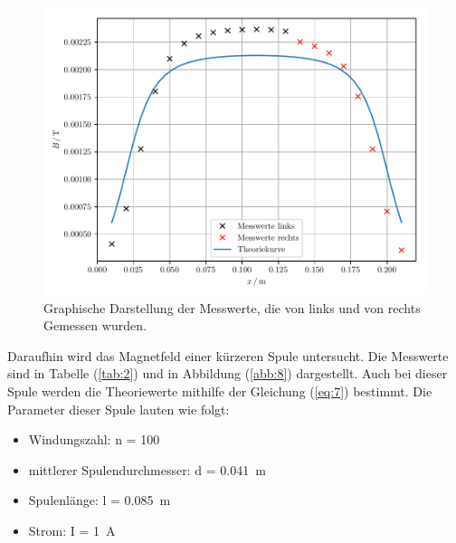 \begin{figure}[H]
  \centering
  \includegraphics{plot1.pdf}
  \caption{Graphische Darstellung der Messwerte, die von links und von rechts Gemessen wurden.}
  \label{abb:7}
\end{figure}


Daraufhin wird das Magnetfeld einer kürzeren Spule untersucht. Die Messwerte sind in
Tabelle (\ref{tab:2}) und in Abbildung (\ref{abb:8}) dargestellt. Auch bei dieser
Spule werden die Theoriewerte mithilfe der Gleichung (\ref{eq:7}) bestimmt. Die
Parameter dieser Spule lauten wie folgt:

\begin{itemize}
  \item Windungszahl: n = 100
  \item mittlerer Spulendurchmesser: d = \SI{0.041}{\meter}
  \item Spulenlänge: l = \SI{0.085}{\meter}
  \item Strom: I = \SI{1}{\ampere}
\end{itemize}

